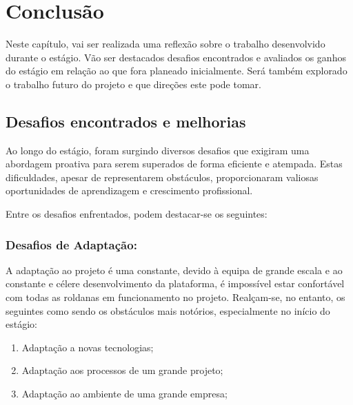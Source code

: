 \section{Conclusão}\label{sec:conclusao}

        Neste capítulo, vai ser realizada uma reflexão sobre o trabalho desenvolvido durante o estágio. Vão ser destacados desafios encontrados e avaliados os ganhos do estágio em relação ao que fora planeado inicialmente. Será também explorado o trabalho futuro do projeto e que direções este pode tomar.

    \subsection{Desafios encontrados e melhorias}\label{sub:desafios_encontrados}

        Ao longo do estágio, foram surgindo diversos desafios que exigiram uma abordagem proativa para serem superados de forma eficiente e atempada. Estas dificuldades, apesar de representarem obstáculos, proporcionaram valiosas oportunidades de aprendizagem e crescimento profissional.

        Entre os desafios enfrentados, podem destacar-se os 
        seguintes:

        \subsubsection*{Desafios de Adaptação:}
        A adaptação ao projeto é uma constante, devido à equipa de grande escala e ao constante e célere desenvolvimento da plataforma, é impossível estar confortável com todas as roldanas em funcionamento no projeto. Realçam-se, no entanto, os seguintes como sendo os obstáculos mais notórios, especialmente no início do estágio:
        \begin{enumerate}
            \item Adaptação a novas tecnologias;
            \item Adaptação aos processos de um grande projeto;
            \item Adaptação ao ambiente de uma grande empresa;
        \end{enumerate}
        
